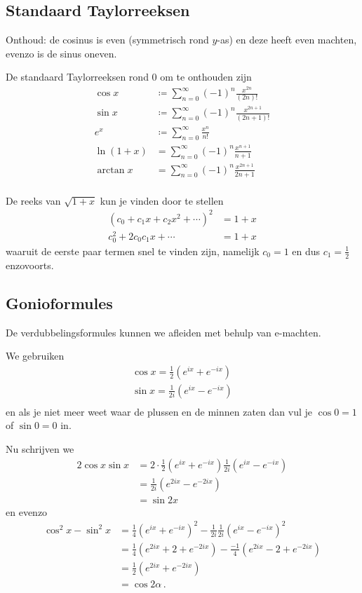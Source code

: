 \documentclass{article}
\begin{document}
	\subsection{Standaard Taylorreeksen}

	Onthoud: de cosinus is even (symmetrisch rond $y$-as) en deze heeft even machten, evenzo is de sinus oneven.

	De standaard Taylorreeksen rond 0 om te onthouden zijn
	\begin{align*}
		\cos x &\coloneqq \sum_{n=0}^\infty (-1)^n \frac{x^{2n}}{(2n)!} \\
		\sin x &\coloneqq \sum_{n=0}^\infty (-1)^n \frac{x^{2n+1}}{(2n+1)!} \\
		e^x &\coloneqq \sum_{n=0}^\infty \frac{x^n}{n!} \\
		\ln (1+x) &= \sum_{n=0}^\infty (-1)^{n} \frac{x^{n+1}}{n+1} \\
		\arctan x &= \sum_{n=0}^\infty (-1)^n \frac{x^{2n+1}}{2n+1} \\
	\end{align*}

	De reeks van $\sqrt{1+x}$ kun je vinden door te stellen
	\begin{align*}
		\left( c_0 + c_1 x + c_2 x^2 + \dotsm \right)^2 &= 1+x \\
		c_0^2 + 2 c_0 c_1 x + \dotsm &= 1+x
	\end{align*}
	waaruit de eerste paar termen snel te vinden zijn, namelijk $c_0=1$ en dus $c_1 = \frac 1 2$ enzovoorts.

	\subsection{Gonioformules} \label{gonioformules}
		 De verdubbelingsformules kunnen we afleiden met behulp van e-machten.

		 We gebruiken
		 \begin{align*}
			\cos x = \frac 1 2 \left( e^{ix} + e^{-ix} \right) \\
			\sin x = \frac 1 {2i} \left( e^{ix} - e^{-ix} \right) \\
		 \end{align*}
		 en als je niet meer weet waar de plussen en de minnen zaten dan vul je $\cos 0 = 1$ of $\sin 0 = 0$ in.

		 Nu schrijven we
		 \begin{align*}
			2 \cos x \sin x &= 2 \cdot \frac 1 2 \left( e^{i x} + e^{-ix} \right) \frac 1 {2i} \left( e^{ix} - e^{-ix} \right) \\
			&= \frac 1 {2i} \left(e^{2 i x} - e^{-2ix} \right) \\
			&= \sin 2 x
		\end{align*}
		en evenzo
		 \begin{align*}
			\cos^2 x - \sin^2 x &= \frac 1 4 \left( e^{ix} + e^{-ix} \right)^2  - \frac 1 {2i} \frac 1 {2i} \left( e^{ix} - e^{-ix} \right)^2 \\
			&= \frac 1 4 \left( e^{2ix} + 2 + e^{-2ix} \right) - \frac {-1} {4} \left( e^{2ix} - 2 + e^{-2ix} \right) \\
			&= \frac {1} {2} \left( e^{2ix} + e^{-2ix} \right) \\
			&= \cos 2\alpha \,.
		\end{align*}
\end{document}
